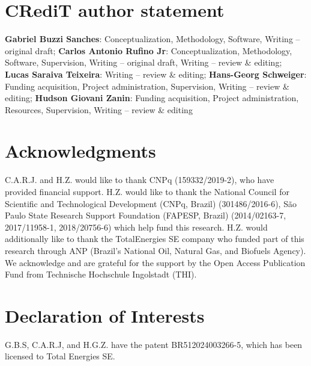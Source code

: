 \documentclass[preprint,12pt]{elsarticle}
\begin{document}













\section*{CRediT author statement}
\textbf{Gabriel Buzzi Sanches}: Conceptualization, Methodology, Software, Writing – original draft; \textbf{Carlos Antonio Rufino Jr}: Conceptualization, Methodology, Software, Supervision, Writing – original draft, Writing – review \& editing; \textbf{Lucas Saraiva Teixeira}: Writing – review \& editing; \textbf{Hans-Georg Schweiger}: Funding acquisition, Project administration, Supervision, Writing – review \& editing; \textbf{Hudson Giovani Zanin}: Funding acquisition, Project administration, Resources, Supervision, Writing – review \& editing


\section*{Acknowledgments}
C.A.R.J. and H.Z. would like to thank CNPq (159332/2019-2), who have provided financial support. H.Z. would like to thank the National Council for Scientific and Technological Development (CNPq, Brazil) (301486/2016-6), São Paulo State Research Support Foundation (FAPESP, Brazil) (2014/02163-7, 2017/11958-1, 2018/20756-6) which help fund this research. H.Z. would additionally like to thank the TotalEnergies SE company who funded part of this research through ANP (Brazil’s National Oil, Natural Gas, and Biofuels Agency). We acknowledge and are grateful for the support by the Open Access Publication Fund from Technische Hochschule Ingolstadt (THI).

\section*{Declaration of Interests}
G.B.S, C.A.R.J, and H.G.Z. have the patent {BR512024003266-5}, which has been licensed to Total Energies SE.

\printacronyms[name=List of Acronyms]




\end{document}
